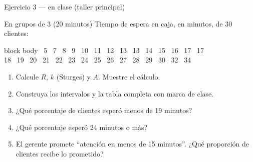\documentclass[aspectratio=169,10pt]{beamer}
\begin{document}
\begin{frame}{Ejercicio 3 — en clase (taller principal)}
  \begin{alertblock}{En grupos de 3 (20 minutos)}
    \footnotesize
    Tiempo de espera en caja, en minutos, de 30 clientes:

    \vspace{0.2cm}
    \begin{beamercolorbox}[wd=0.95\textwidth,sep=0.12cm]{block body}
      \centering\scriptsize{} \ 5 \ 7 \ 8 \ 9 \ 10 \ 11 \ 12 \ 13 \ 13 \ 14 \ 15 \ 16 \ 17 \ 17 \\
      18 \ 19 \ 20 \ 21 \ 22 \ 23 \ 24 \ 25 \ 26 \ 27 \ 28 \ 29 \ 30 \ 32 \ 34
    \end{beamercolorbox}

    \vspace{0.2cm}
    \begin{enumerate}\setlength{\itemsep}{-0.05cm}
      \item Calcule $R$, $k$ (Sturges) y $A$. Muestre el cálculo.
      \item Construya los intervalos y la tabla completa con marca de clase.
      \item ¿Qué porcentaje de clientes esperó menos de 19 minutos?
      \item ¿Qué porcentaje esperó 24 minutos o más?
      \item El gerente promete ``atención en menos de 15 minutos''.
            ¿Qué proporción de clientes recibe lo prometido?
    \end{enumerate}
  \end{alertblock}
\end{frame}
\end{document}

